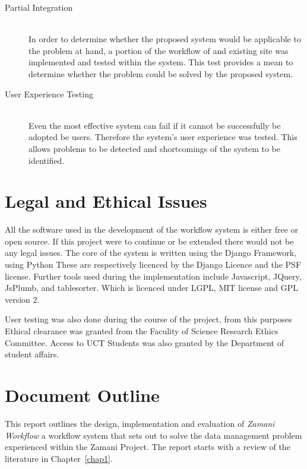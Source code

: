 \documentclass[12pt,a4paper]{report}
\begin{document}
    \begin{description}
        \item[Partial Integration]\hfill \\
            In order to determine whether the proposed system
            would be applicable to the problem at hand, a portion of the workflow
            of and existing site was implemented and tested within the system. This
            test provides a mean to determine whether the problem could be solved
            by the proposed system.
        \item[User Experience Testing] \hfill \\
            Even the most effective system can fail if it cannot
            be successfully be adopted be users. Therefore the system's
            user experience was tested. This allows problems to be detected and
            shortcomings of the system to be identified\cite{tullis2008measuring}.
    \end{description}

\section{Legal and Ethical Issues}
    All the software used in the development of the workflow system
    is either free or open source. If this project were to continue
    or be extended there would not be any legal issues. The core
    of the system is written using the Django Framework, using Python
    These are respectively licenced by the Django Licence and the PSF
    license. Further tools used during the implementation include Javascript,
    JQuery, JsPlumb, and tablesorter. Which is licenced under LGPL,
    MIT license and GPL version 2.

    User testing was also done during the course of the project, from
    this purposes Ethical clearance was granted from the Faculity of
    Science Research Ethics Committee. Access to UCT Students was also
    granted by the Department of student affairs.

\section{Document Outline}
    This report outlines the design, implementation and evaluation
    of \emph{Zamani Workflow} a workflow system that sets out to
    solve the data management problem experienced within the
    Zamani Project. The report starts with a review of the literature in
    Chapter~\ref{chap1}.
\end{document}
